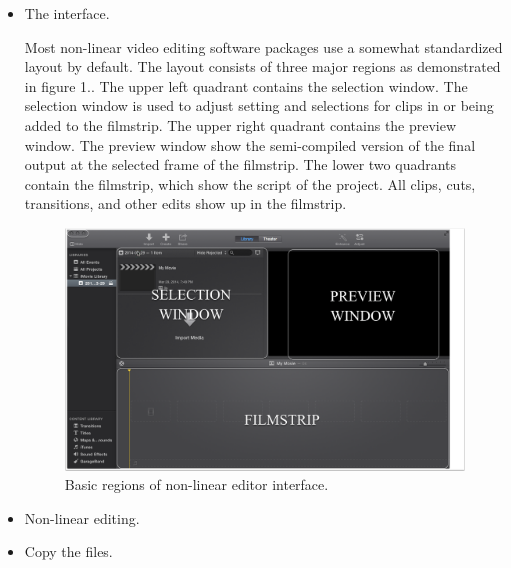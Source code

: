 \documentclass[letterpaper]{latexclasses/tmarticle}
\begin{document}
\begin{itemize}
    \item
    The interface.
    
    Most non-linear video editing software packages use a somewhat standardized
    layout by default.  The layout consists of three major regions as
    demonstrated in figure 1..  The upper left quadrant contains the selection
    window.  The selection window is used to adjust setting and selections for
    clips in or being added to the filmstrip.  The upper right quadrant contains
    the preview window.  The preview window show the semi-compiled version of
    the final output at the selected frame of the filmstrip.  The lower two
    quadrants contain the filmstrip, which show the script of the project.  All
    clips, cuts, transitions, and other edits show up in the filmstrip.
    
    
    \begin{figure}[h]
        \centering
        \includegraphics[width=6.0in]{iMovieInterface.png}
        \caption{Basic regions of non-linear editor interface.}
    \end{figure}
    
    \item
    Non-linear editing.
    
    
    \item
    Copy the files.
    
    

\end{itemize}
\end{document}
